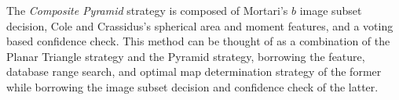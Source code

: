 The \textit{Composite Pyramid} strategy is composed of Mortari's $b$ image subset decision, Cole and Crassidus's spherical area and moment features, and a voting based confidence check.
This method can be thought of as a combination of the Planar Triangle strategy and the Pyramid strategy, borrowing the feature, database range search, and optimal map determination strategy of the former while borrowing the image subset decision and confidence check of the latter.

%


%    
